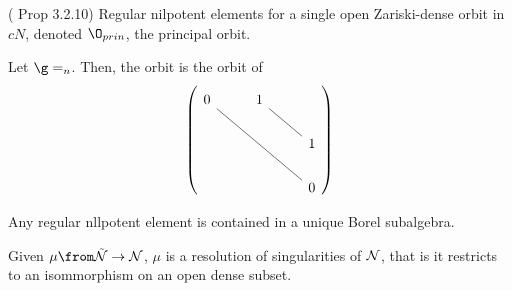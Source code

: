 \begin{prop}
  (\cite{cg} Prop 3.2.10) Regular nilpotent elements for a single open
  Zariski-dense orbit in \(cN\), denoted \(\O_{prin}\), the principal orbit.
\end{prop}
\begin{example}
  Let \(\g = \sl_n\). Then, the orbit is the orbit of \[
    \left(
      \begin{tikzcd}
        0 \ar[rrdd, dash] & 1 \ar[rd, dash] & \\
        & & 1 \\
        & & 0
      \end{tikzcd}
    \right)
\]
\end{example}
\begin{prop}
  Any regular nllpotent element is contained in a unique Borel
  subalgebra. 
\end{prop}
\begin{rmk}
  Given \(\mu \from \tilde{\cN} \to \cN\), \(\mu\) is a resolution of
  singularities of \(\mathcal{N}\), that is it restricts to an isommorphism on
  an open dense subset.
\end{rmk}
